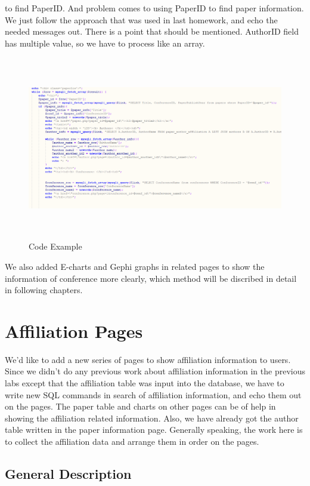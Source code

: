\documentclass{book}
\begin{document}
to find PaperID. And problem comes to using PaperID to find paper information.  We just follow the approach that was used in last homework, and echo the needed messages out. There is a point that should be mentioned. AuthorID field has multiple value, so we have to process like an array.
\begin{figure}[H]
\centering
\includegraphics[height=8.0cm,width=16.0cm]{img/yhb_con_1.png}
\caption{Code Example}
\end{figure}


We also added E-charts and Gephi graphs in related pages to show the information of conference more clearly, which method will be discribed in detail in following chapters.



\section {Affiliation Pages}

We'd like to add a new series of pages to show affiliation information to users. Since we didn't do any previous work about affiliation information in the previous labs except that the affiliation table was input into the database, we have to write new SQL commands in search of affiliation information, and echo them out on the pages. The paper table and charts on other pages can be of help in showing the affiliation related information. Also, we have already got the author table written in the paper information page. Generally speaking, the work here is to collect the affiliation data and arrange them in order on the pages.


\subsection {General Description}
\end{document}
